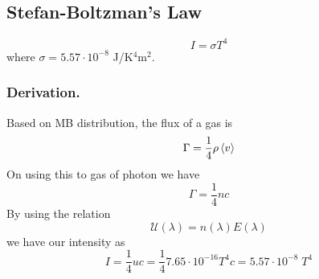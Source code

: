 \documentclass[../../../Main.tex]{subfiles}
\begin{document}
\subsection{Stefan-Boltzman's Law}
\begin{equation*}
    I=\sigma T^4
\end{equation*}
where $\sigma=5.57\cdot10^{-8}$ J/K$^{4}$m$^{2}$.

\subsubsection{Derivation.} Based on MB distribution, the flux of a gas is 
\begin{equation*}
    \Gamma=\frac{1}{4}\rho\braket{v}
\end{equation*}
On using this to gas of photon we have 
\begin{equation*}
    \Gamma=\frac{1}{4}nc
\end{equation*} 
By using the relation 
\begin{equation*}
    \mathcal{U}(\lambda)=n(\lambda)E(\lambda)
\end{equation*}
we have our intensity as 
\begin{equation*}
    I=\frac{1}{4}uc=\frac{1}{4}7.65\cdot10^{-16} T^4c=5.57\cdot10^{-8}\; T^4
\end{equation*}
\end{document}
